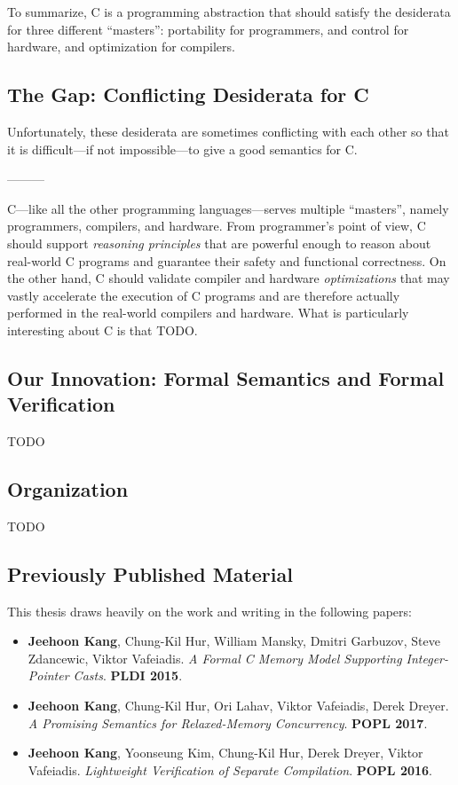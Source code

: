 To summarize, C is a programming abstraction that should satisfy the desiderata for three different
``masters'': portability for programmers, and control for hardware, and optimization for compilers.


\subsection{The Gap: Conflicting Desiderata for C}

Unfortunately, these desiderata are sometimes conflicting with each other so that it is
difficult---if not impossible---to give a good semantics for C.


---------

C---like all the other programming languages---serves multiple ``masters'', namely programmers,
compilers, and hardware.  From programmer's point of view, C should support \emph{reasoning
  principles} that are powerful enough to reason about real-world C programs and guarantee their
safety and functional correctness.  On the other hand, C should validate compiler and hardware
\emph{optimizations} that may vastly accelerate the execution of C programs and are therefore
actually performed in the real-world compilers and hardware.  What is particularly interesting about
C is that TODO.


\subsection{Our Innovation: Formal Semantics and Formal Verification}

TODO


\subsection{Organization}

TODO


\subsection{Previously Published Material}

This thesis draws heavily on the work and writing in the following papers:

\begin{itemize}
\item[\cite{intptrcast}] \textbf{Jeehoon Kang}, Chung-Kil Hur, William Mansky, Dmitri Garbuzov,
  Steve Zdancewic, Viktor Vafeiadis.  \emph{A Formal C Memory Model Supporting Integer-Pointer
    Casts}.  \textbf{PLDI 2015}.
\item[\cite{promising}] \textbf{Jeehoon Kang}, Chung-Kil Hur, Ori Lahav, Viktor Vafeiadis, Derek
  Dreyer.  \emph{A Promising Semantics for Relaxed-Memory Concurrency}.  \textbf{POPL 2017}.
\item[\cite{sepcomp}] \textbf{Jeehoon Kang}, Yoonseung Kim, Chung-Kil Hur, Derek Dreyer, Viktor
  Vafeiadis.  \emph{Lightweight Verification of Separate Compilation}.  \textbf{POPL 2016}.
\end{itemize}

